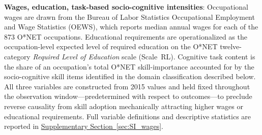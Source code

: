 \documentclass[11pt, letterpaper]{article} %
\begin{document}
\textbf{Wages, education, task-based socio-cognitive intensities}: Occupational wages are drawn from the Bureau of Labor Statistics Occupational Employment and Wage Statistics (OEWS), which reports median annual wages for each of the 873 O*NET occupations. Educational requirements are operationalized as the occupation-level expected level of required education on the O*NET twelve-category \emph{Required Level of Education} scale (Scale~RL). Cognitive task content is the share of an occupation's total O*NET skill-importance accounted for by the socio-cognitive skill items identified in the domain classification described below. All three variables are constructed from 2015 values and held fixed throughout the observation window---predetermined with respect to outcomes---to preclude reverse causality from skill adoption mechanically attracting higher wages or educational requirements. Full variable definitions and descriptive statistics are reported in \hyperref[sec:SI_wages]{Supplementary Section~\ref*{sec:SI_wages}}.
\end{document}
